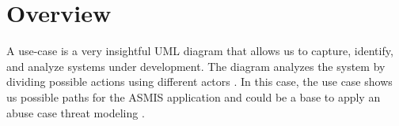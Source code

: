 \section{Overview}
A use-case is a very insightful UML diagram that allows us to capture, identify, and analyze systems under development. The diagram analyzes the system by dividing possible actions using different actors \citep[p.~64]{jacobson2021unified}. In this case, the use case shows us possible paths for the ASMIS application and could be a base to apply an abuse case threat modeling \citep [p.~59]{usecase_abuse_case}.

